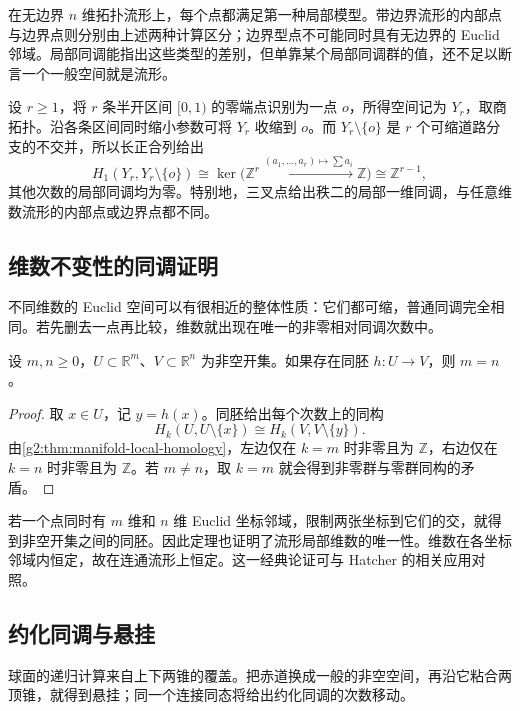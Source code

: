 在无边界 \(n\) 维拓扑流形上，每个点都满足第一种局部模型。带边界流形的内部点与边界点则分别由上述两种计算区分；边界型点不可能同时具有无边界的 Euclid 邻域。局部同调能指出这些类型的差别，但单靠某个局部同调群的值，还不足以断言一个一般空间就是流形。

\begin{example}\label{g2:exm:branch-local-homology}
	设 \(r\ge1\)，将 \(r\) 条半开区间 \([0,1)\) 的零端点识别为一点 \(o\)，所得空间记为 \(Y_r\)，取商拓扑。沿各条区间同时缩小参数可将 \(Y_r\) 收缩到 \(o\)。而 \(Y_r\setminus\{o\}\) 是 \(r\) 个可缩道路分支的不交并，所以长正合列给出
	\[
		H_1(Y_r,Y_r\setminus\{o\})
		\cong\ker\bigl(\mathbb Z^r\xrightarrow{(a_1,\ldots,a_r)\mapsto\sum a_i}\mathbb Z\bigr)
		\cong\mathbb Z^{r-1},
	\]
	其他次数的局部同调均为零。特别地，三叉点给出秩二的局部一维同调，与任意维数流形的内部点或边界点都不同。
\end{example}

\subsection{维数不变性的同调证明}
\label{g2:subsec:0204:03}
不同维数的 Euclid 空间可以有很相近的整体性质：它们都可缩，普通同调完全相同。若先删去一点再比较，维数就出现在唯一的非零相对同调次数中。

\begin{theorem}[维数不变性]\label{g2:thm:homological-invariance-dimension}
	设 \(m,n\ge0\)，\(U\subset\mathbb R^m\)、\(V\subset\mathbb R^n\) 为非空开集。如果存在同胚 \(h:U\to V\)，则 \(m=n\)。
\end{theorem}
\begin{proof}
	取 \(x\in U\)，记 \(y=h(x)\)。同胚给出每个次数上的同构
	\[
		H_k(U,U\setminus\{x\})
		\cong H_k(V,V\setminus\{y\}).
	\]
	由\cref{g2:thm:manifold-local-homology}，左边仅在 \(k=m\) 时非零且为 \(\mathbb Z\)，右边仅在 \(k=n\) 时非零且为 \(\mathbb Z\)。若 \(m\ne n\)，取 \(k=m\) 就会得到非零群与零群同构的矛盾。
\end{proof}

若一个点同时有 \(m\) 维和 \(n\) 维 Euclid 坐标邻域，限制两张坐标到它们的交，就得到非空开集之间的同胚。因此定理也证明了流形局部维数的唯一性。维数在各坐标邻域内恒定，故在连通流形上恒定。这一经典论证可与 Hatcher 的相关应用对照\cite[第2.1节]{Hatcher2002}。

\subsection{约化同调与悬挂}
\label{g2:subsec:0204:04}
球面的递归计算来自上下两锥的覆盖。把赤道换成一般的非空空间，再沿它粘合两顶锥，就得到悬挂；同一个连接同态将给出约化同调的次数移动。

